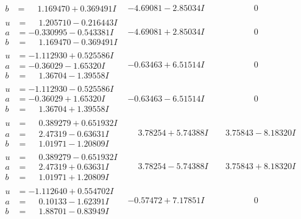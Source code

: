 \documentclass[1p]{elsarticle_modified}
\theoremstyle{definition}
\begin{document}
$$\begin{array}{c|c|c}
\begin{aligned}
b &= \phantom{-}1.169470 + 0.369491 I\end{aligned}
 & -4.69081 - 2.85034 I & \phantom{-0.000000 } 0 \\ \hline\begin{aligned}
u &= \phantom{-}1.205710 - 0.216443 I \\
a &= -0.330995 - 0.543381 I \\
b &= \phantom{-}1.169470 - 0.369491 I\end{aligned}
 & -4.69081 + 2.85034 I & \phantom{-0.000000 } 0 \\ \hline\begin{aligned}
u &= -1.112930 + 0.525586 I \\
a &= -0.36029 - 1.65320 I \\
b &= \phantom{-}1.36704 - 1.39558 I\end{aligned}
 & -0.63463 + 6.51514 I & \phantom{-0.000000 } 0 \\ \hline\begin{aligned}
u &= -1.112930 - 0.525586 I \\
a &= -0.36029 + 1.65320 I \\
b &= \phantom{-}1.36704 + 1.39558 I\end{aligned}
 & -0.63463 - 6.51514 I & \phantom{-0.000000 } 0 \\ \hline\begin{aligned}
u &= \phantom{-}0.389279 + 0.651932 I \\
a &= \phantom{-}2.47319 - 0.63631 I \\
b &= \phantom{-}1.01971 - 1.20809 I\end{aligned}
 & \phantom{-}3.78254 + 5.74388 I & \phantom{-}3.75843 - 8.18320 I \\ \hline\begin{aligned}
u &= \phantom{-}0.389279 - 0.651932 I \\
a &= \phantom{-}2.47319 + 0.63631 I \\
b &= \phantom{-}1.01971 + 1.20809 I\end{aligned}
 & \phantom{-}3.78254 - 5.74388 I & \phantom{-}3.75843 + 8.18320 I \\ \hline\begin{aligned}
u &= -1.112640 + 0.554702 I \\
a &= \phantom{-}0.10133 - 1.62391 I \\
b &= \phantom{-}1.88701 - 0.83949 I\end{aligned}
 & -0.57472 + 7.17851 I & \phantom{-0.000000 } 0 \\ \hline\begin{aligned}

\end{aligned}
\end{array}$$
\end{document}
